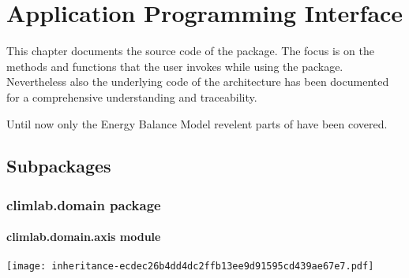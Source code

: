 \documentclass[a4paper,10pt,english]{sphinxmanual}
\begin{document}
\chapter{Application Programming Interface}
\label{api/climlab:application-programming-interface}\label{api/climlab::doc}
This chapter documents the source code of the  package. The focus is on the methods and functions that the user invokes while using the package. Nevertheless also the underlying code of the  architecture has been documented for a comprehensive understanding and traceability.

Until now only the Energy Balance Model revelent parts of  have been covered.
\label{api/climlab:module-climlab}

\section{Subpackages}
\label{api/climlab:subpackages}

\subsection{climlab.domain package}
\label{api/climlab.domain:climlab-domain-package}\label{api/climlab.domain::doc}

\subsubsection{climlab.domain.axis module}
\label{api/climlab.domain:climlab-domain-axis-module}
\texttt{[image: inheritance-ecdec26b4dd4dc2ffb13ee9d91595cd439ae67e7.pdf]}
\label{api/climlab.domain:module-climlab.domain.axis}
\end{document}
